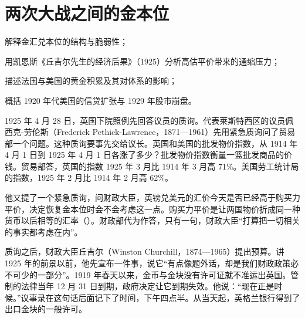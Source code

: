\chapter{两次大战之间的金本位}\label{ch:interwar}

\begin{chapterguide}
\begin{guidegoals}
\item 解释金汇兑本位的结构与脆弱性；
\item 用凯恩斯《丘吉尔先生的经济后果》（1925）分析高估平价带来的通缩压力；
\item 描述法国与美国的黄金积累及其对体系的影响；
\item 概括 1920 年代美国的信贷扩张与 1929 年股市崩盘。
\end{guidegoals}
\end{chapterguide}

1925 年 4 月 28 日，英国下院照例先回答议员的质询。代表莱斯特西区的议员佩西克-劳伦斯（Frederick Pethick-Lawrence，1871—1961）先用紧急质询问了贸易部一个问题\cite{hansardpeople27}。这种质询要事先交给议长\cite{hansard1925}。英国和美国的批发物价指数，从 1914 年 4 月 1 日到 1925 年 4 月 1 日各涨了多少\cite{hansard1925}？批发物价指数衡量一篮批发商品的价钱。贸易部答，英国的指数 1925 年 3 月比 1914 年 3 月高 71\%。美国劳工统计局的指数，1925 年 2 月比 1914 年 2 月高 62\%\cite{hansard1925}。

他又提了一个紧急质询，问财政大臣，英镑兑美元的汇价今天是否已经高于购买力平价，决定恢复金本位时会不会考虑这一点\cite{hansard1925}。购买力平价是让两国物价折成同一种货币以后相等的汇率（）。财政部代为作答，只有一句，财政大臣“打算把一切相关的事实都考虑在内”\cite{hansard1925}。

质询之后，财政大臣丘吉尔（Winston Churchill，1874—1965）提出预算\cite{hansard1925,hansardpeople27}。讲 1925 年的前景以前，他先宣布一件事，说它“有点像题外话，却是我们财政政策必不可少的一部分”\cite{hansard1925}。1919 年春天以来，金币与金块没有许可证就不准运出英国。管制的法律当年 12 月 31 日到期，政府决定让它到期失效\cite{hansard1925}。他说：“现在正是时候。”议事录在这句话后面记下了时间，下午四点半\cite{hansard1925}。从当天起，英格兰银行得到了出口金块的一般许可。

